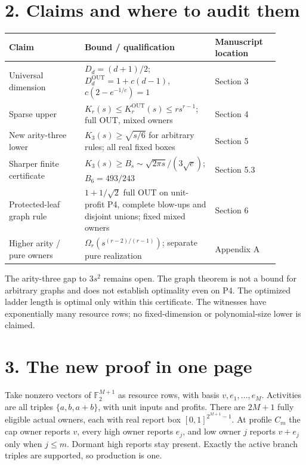 \documentclass[11pt]{article}
\begin{document}
\section*{2. Claims and where to audit them}
\begin{center}\small
\begin{tabular}{p{0.27\linewidth}p{0.40\linewidth}p{0.23\linewidth}}
\toprule
Claim & Bound / qualification & Manuscript location\\\midrule
Universal dimension & $D_d=(d+1)/2$; $D_d^{\mathrm{OUT}}=1+c(d-1)$,
$c(2-e^{-1/c})=1$ & Section 3\\[3pt]
Sparse upper & $K_r(s)\le K_r^{\mathrm{OUT}}(s)\le rs^{r-1}$;
full OUT, mixed owners & Section 4\\[3pt]
New arity-three lower & $K_3(s)\ge\sqrt{s/6}$ for arbitrary rules;
all real fixed boxes & Section 5\\[3pt]
Sharper finite certificate & $K_3(s)\ge B_s\sim\sqrt{2\pi s}/(3\sqrt e)$;
$B_6=493/243$ & Section 5.3\\[3pt]
Protected-leaf graph rule & $1+1/\sqrt2$ full OUT on unit-profit P4,
complete blow-ups and disjoint unions; fixed mixed owners & Section 6\\[3pt]
Higher arity / pure owners & $\Omega_r(s^{(r-2)/(r-1)})$;
separate pure realization & Appendix A\\\bottomrule
\end{tabular}
\end{center}
The arity-three gap to $3s^2$ remains open. The graph theorem is not a bound
for arbitrary graphs and does not establish optimality even on P4. The optimized ladder length is
optimal only within this certificate. The witnesses have exponentially many
resource rows; no fixed-dimension or polynomial-size lower is claimed.

\section*{3. The new proof in one page}
Take nonzero vectors of $\mathbb F_2^{M+1}$ as resource rows, with basis
$v,e_1,\ldots,e_M$. Activities are all triples $\{a,b,a+b\}$, with unit
inputs and profits. There are $2M+1$ fully eligible actual owners, each with
real report box $[0,1]^{2^{M+1}-1}$. At profile $C_m$ the cap owner reports
$v$, every high owner reports $e_j$, and low owner $j$ reports $v+e_j$ only
when $j\le m$. Dormant high reports stay present. Exactly the active branch
triples are supported, so production is one.
\end{document}
